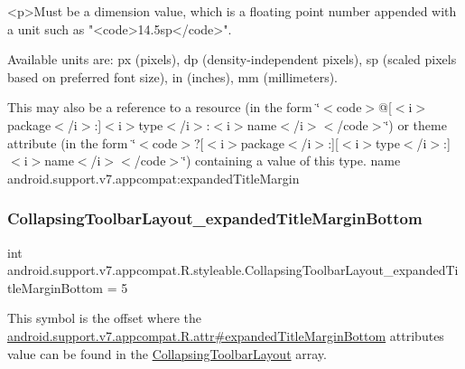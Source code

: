 \begin{DoxyVerb}      <p>Must be a dimension value, which is a floating point number appended with a unit such as "<code>14.5sp</code>".
\end{DoxyVerb}
 Available units are\+: px (pixels), dp (density-\/independent pixels), sp (scaled pixels based on preferred font size), in (inches), mm (millimeters). 

This may also be a reference to a resource (in the form \char`\"{}$<$code$>$@\mbox{[}$<$i$>$package$<$/i$>$\+:\mbox{]}$<$i$>$type$<$/i$>$\+:$<$i$>$name$<$/i$>$$<$/code$>$\char`\"{}) or theme attribute (in the form \char`\"{}$<$code$>$?\mbox{[}$<$i$>$package$<$/i$>$\+:\mbox{]}\mbox{[}$<$i$>$type$<$/i$>$\+:\mbox{]}$<$i$>$name$<$/i$>$$<$/code$>$\char`\"{}) containing a value of this type.  name android.\+support.\+v7.\+appcompat\+:expanded\+Title\+Margin \mbox{\label{classandroid_1_1support_1_1v7_1_1appcompat_1_1R_1_1styleable_a9921e0babb5ad3a5043223af603a47c0}} 
\subsubsection{\texorpdfstring{Collapsing\+Toolbar\+Layout\+\_\+expanded\+Title\+Margin\+Bottom}{CollapsingToolbarLayout\_expandedTitleMarginBottom}}
{\footnotesize\ttfamily int android.\+support.\+v7.\+appcompat.\+R.\+styleable.\+Collapsing\+Toolbar\+Layout\+\_\+expanded\+Title\+Margin\+Bottom = 5\hspace{0.3cm}{\ttfamily [static]}}

This symbol is the offset where the \hyperlink{classandroid_1_1support_1_1v7_1_1appcompat_1_1R_1_1attr_a27c921b6ba56656c0f68d92fd8d73095}{android.\+support.\+v7.\+appcompat.\+R.\+attr\#expanded\+Title\+Margin\+Bottom} attribute\textquotesingle{}s value can be found in the \hyperlink{classandroid_1_1support_1_1v7_1_1appcompat_1_1R_1_1styleable_a8d282d917f35e5a08dd37db243410383}{Collapsing\+Toolbar\+Layout} array.

